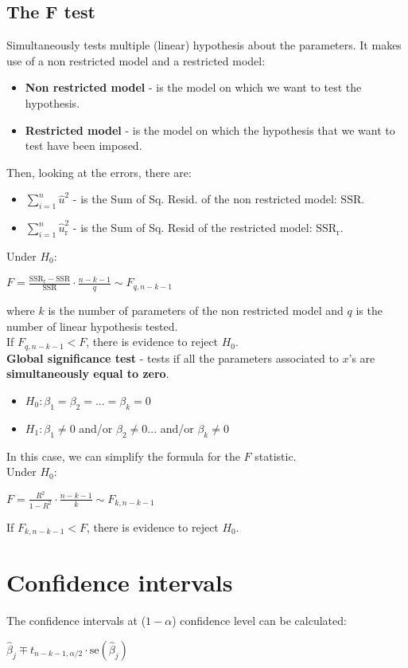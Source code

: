 \documentclass[10pt, a4paper, landscape]{extarticle}
\newcommand{\se}{\mathrm{se}}
\newcommand{\SSR}{\mathrm{SSR}}
\begin{document}
\begin{multicols}{3}
	\subsection*{The F test}
		Simultaneously tests multiple (linear) hypothesis about the parameters. It makes use of a non restricted model and a restricted model:
		\begin{itemize}[leftmargin=*]
			\item \textbf{Non restricted model} - is the model on which we want to test the hypothesis.
			\item \textbf{Restricted model} - is the model on which the hypothesis that we want to test have been imposed.
		\end{itemize}
		Then, looking at the errors, there are:
		\begin{itemize}[leftmargin=*]
			\item \textbf{$\sum_{i=1}^n \hat{u}^2$} - is the Sum of Sq. Resid. of the non restricted model: $\SSR$.
			\item \textbf{$\sum_{i=1}^n \hat{u}_\mathrm{r}^2$} - is the Sum of Sq. Resid of the restricted model: $\SSR_\mathrm{r}$.
		\end{itemize}
		Under $H_0$:
		\begin{center}
			$F = \frac{\SSR_\mathrm{r} - \SSR}{\SSR} \cdot \frac{n-k-1}{q} \sim F_{q, n-k-1}$
		\end{center}
		where $k$ is the number of parameters of the non restricted model and $q$ is the number of linear hypothesis tested. \\
		If $F_{q, n-k-1} < F$, there is evidence to reject $H_0$. \\
		\textbf{Global significance test} - tests if all the parameters associated to $x$'s are \textbf{simultaneously equal to zero}.
		\begin{itemize}[leftmargin=*]
			\item $H_0: \beta_1 = \beta_2 = ... = \beta_k = 0$
			\item $H_1: \beta_1 \neq 0$ and/or $\beta_2 \neq 0 ...$ and/or $\beta_k \neq 0$
		\end{itemize}
		In this case, we can simplify the formula for the $F$ statistic. \\
		Under $H_0$:
		\begin{center}
			$F = \frac{R^2}{1 - R^2} \cdot \frac{n-k-1}{k} \sim F_{k, n-k-1}$
		\end{center}
		If $F_{k, n-k-1} < F$, there is evidence to reject $H_0$.

\section*{Confidence intervals}
	The confidence intervals at ($1 - \alpha$) confidence level can be calculated:
	\begin{center}
		$\hat{\beta}_j \mp t_{n-k-1, \alpha/2} \cdot \se(\hat{\beta}_j)$
	\end{center}


\end{multicols}
\end{document}
